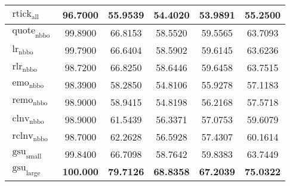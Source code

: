 \begin{table}
\begin{tabular}{@{}lSSSSS@{}}
        $\operatorname{rtick}_{\mathrm{all}}$  & 96.7000           & 55.9539                            & 54.4020           & 53.9891           & 55.2500           \\ \midrule
        $\operatorname{quote}_{\mathrm{nbbo}}$ & 99.8900           & 66.8153                            & 58.5520           & 59.5565           & 63.7093           \\
        $\operatorname{lr}_{\mathrm{nbbo}}$    & 99.7900           & 66.6404                            & 58.5902           & 59.6145           & 63.6236           \\
        $\operatorname{rlr}_{\mathrm{nbbo}}$   & 98.7200           & 66.8250                            & 58.6446           & 59.6458           & 63.7515           \\
        $\operatorname{emo}_{\mathrm{nbbo}}$   & 98.3900           & 58.2850                            & 54.8106           & 55.9278           & 57.1183           \\
        $\operatorname{remo}_{\mathrm{nbbo}}$  & 98.9000           & 58.9415                            & 54.8198           & 56.2168           & 57.5718           \\
        $\operatorname{clnv}_{\mathrm{nbbo}}$  & 98.9000           & 61.5439                            & 56.3371           & 57.0753           & 59.6079           \\
        $\operatorname{rclnv}_{\mathrm{nbbo}}$ & 98.7000           & 62.2628                            & 56.5928           & 57.4307           & 60.1614           \\ \midrule
        $\operatorname{gsu}_{\mathrm{small}}$  & 99.8400           & 66.7098                            & 58.7642           & 59.8383           & 63.7449           \\
        $\operatorname{gsu}_{\mathrm{large}}$  & \bfseries 100.000 & \bfseries 79.7126                  & \bfseries 68.8358 & \bfseries 67.2039 & \bfseries 75.0322 \\
        \bottomrule
    \end{tabular}
\end{table}


